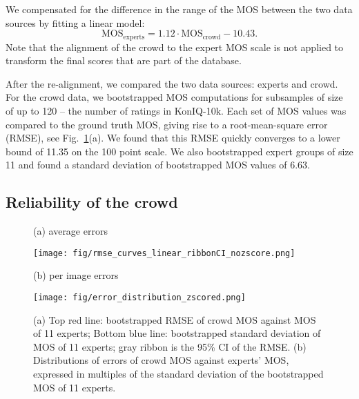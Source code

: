 \documentclass[10pt,journal,compsoc]{IEEEtran}
\begin{document}
We compensated for the difference in the range of the MOS between the two data sources by fitting a linear model: 
$$\text{MOS}_\text{experts} = 1.12\cdot\text{MOS}_\text{crowd} - 10.43.$$ Note that the alignment of the crowd to the expert MOS scale is not applied to transform the final scores that are part of the database.

After the re-alignment, we compared the two data sources: experts and crowd. For the crowd data, we bootstrapped MOS computations for subsamples of size of up to 120 -- the number of ratings in KonIQ-10k. Each set of MOS values was compared to the ground truth MOS, giving rise to a root-mean-square error (RMSE), see Fig.~\ref{fig:rmse_curves}(a). We found that this RMSE quickly converges to a lower bound of 11.35 on the 100 point scale. We also bootstrapped expert groups of size 11 and found a standard deviation of bootstrapped MOS values of 6.63.












\subsection{Reliability of the crowd}
\label{sec:reliability}




\begin{figure}[!t]
\centering
\begin{minipage}{.46\linewidth}
\centerline{(a) average errors}
\centerline{\texttt{[image: fig/rmse\_curves\_linear\_ribbonCI\_nozscore.png]}}
\end{minipage}\begin{minipage}{.46\linewidth}
\centerline{(b) per image errors}
\centerline{\texttt{[image: fig/error\_distribution\_zscored.png]}}
\end{minipage}

\caption{(a) Top red line: bootstrapped RMSE of crowd  MOS against MOS of 11 experts; Bottom blue line: bootstrapped standard deviation of MOS of 11 experts; gray ribbon is the 95\% CI of the RMSE. (b) Distributions of errors of crowd MOS against experts' MOS, expressed in multiples of the standard deviation of the bootstrapped MOS of 11 experts.}
\label{fig:rmse_curves}
\end{figure}
\end{document}
